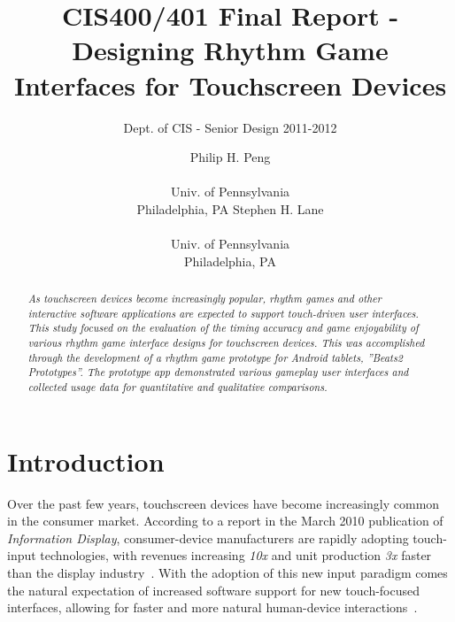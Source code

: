 \documentclass{sig-alternate}
\begin{document}
 

\title{CIS400/401 Final Report - Designing Rhythm Game Interfaces for Touchscreen Devices}
\subtitle{Dept. of CIS - Senior Design 2011-2012}
\author{
\alignauthor Philip H. Peng \\  \\ Univ. of Pennsylvania \\ Philadelphia, PA
\alignauthor Stephen H. Lane \\  \\ Univ. of Pennsylvania \\ Philadelphia, PA}
\date{}
\maketitle

\begin{abstract}
\textit{As touchscreen devices become increasingly popular, rhythm games and other interactive software applications are expected to support touch-driven user interfaces. This study focused on the evaluation of the timing accuracy and game enjoyability of various rhythm game interface designs for touchscreen devices. This was accomplished through the development of a rhythm game prototype for Android tablets, ''Beats2 Prototypes''. The prototype app demonstrated various gameplay user interfaces and collected usage data for quantitative and qualitative comparisons.}
\end{abstract}

\section{Introduction}
\label{sec:intro}
Over the past few years, touchscreen devices have become increasingly common in the consumer market. According to a report in the March 2010 publication of \textit{Information Display}, consumer-device manufacturers are rapidly adopting touch-input technologies, with revenues increasing \textit{10x} and unit production \textit{3x} faster than the display industry~\cite{information_display}. With the adoption of this new input paradigm comes the natural expectation of increased software support for new touch-focused interfaces, allowing for faster and more natural human-device interactions~\cite{hayes_thesis}.\\
\end{document}
